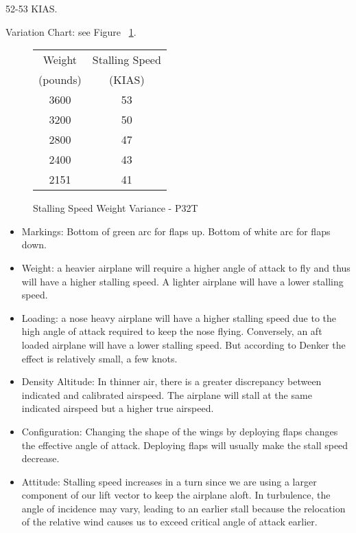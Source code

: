 52-53 KIAS.

Variation Chart: see Figure ~\ref{fig:StallSpeedsP32T}.

\begin{figure}
\begin{center}
\begin{tabular}{ |c|c| }
    \hline
    Weight & Stalling Speed \\
    (pounds) & (KIAS) \\
    \hline
     3600 &  53 \\
     3200 &  50 \\
    \hline
     2800 &  47 \\
     2400 &  43 \\
    \hline
     2151 &  41 \\
    \hline
\end{tabular}
\end{center}
\caption{Stalling Speed Weight Variance - P32T}
\label{fig:StallSpeedsP32T}
\end{figure}


\begin{itemize}
\item Markings: Bottom of green arc for flaps up. Bottom of white arc for flaps down.
\item Weight: a heavier airplane will require a higher angle of attack to fly and thus will have a higher stalling speed. A lighter airplane will have a lower stalling speed.
\item Loading: a nose heavy airplane will have a higher stalling speed due to the high angle of attack required to keep the nose flying. Conversely, an aft loaded airplane will have a lower stalling speed. But according to Denker the effect is relatively small, a few knots.
\item Density Altitude: In thinner air, there is a greater discrepancy between indicated and calibrated airspeed. The airplane will stall at the same indicated airspeed but a higher true airspeed.  
\item Configuration: Changing the shape of the wings by deploying flaps changes the effective angle of attack. Deploying flaps will usually make the stall speed decrease.
\item Attitude: Stalling speed increases in a turn since we are using a larger component of our lift vector to keep the airplane aloft. In turbulence, the angle of incidence may vary, leading to an earlier stall because the relocation of the relative wind causes us to exceed critical angle of attack earlier. 
\end{itemize}


